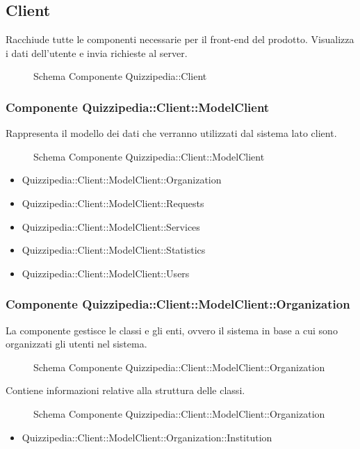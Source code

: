\subsection{Client}
Racchiude tutte le componenti necessarie per il front-end del prodotto. Visualizza i dati dell'utente e invia richieste al server.
\begin{figure}[H]
\centering
\noindent{}
\caption{Schema Componente Quizzipedia::Client}
\end{figure}
\subsubsection{Componente Quizzipedia::Client::ModelClient}
Rappresenta il modello dei dati che verranno utilizzati dal sistema lato client.
\begin{figure}[H]
\centering
\noindent{}
\caption{Schema Componente Quizzipedia::Client::ModelClient}
\end{figure}
\begin{itemize}
\item Quizzipedia::Client::ModelClient::Organization
\item Quizzipedia::Client::ModelClient::Requests
\item Quizzipedia::Client::ModelClient::Services
\item Quizzipedia::Client::ModelClient::Statistics
\item Quizzipedia::Client::ModelClient::Users
\end{itemize}
\subsubsection{Componente Quizzipedia::Client::ModelClient::Organization}
La componente gestisce le classi e gli enti, ovvero il sistema in base a cui sono organizzati gli utenti nel sistema.
\begin{figure}[H]
\centering
\noindent{}
\caption{Schema Componente Quizzipedia::Client::ModelClient::Organization}
\end{figure}
Contiene informazioni relative alla struttura delle classi.
\begin{figure}[H]
\centering
\noindent{}
\caption{Schema Componente Quizzipedia::Client::ModelClient::Organization}
\end{figure}
\begin{itemize}
\item Quizzipedia::Client::ModelClient::Organization::Institution
\end{itemize}
